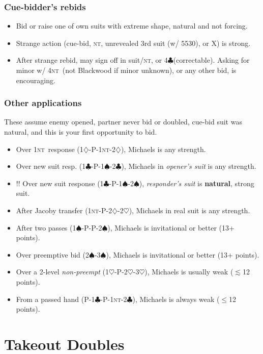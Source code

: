 \documentclass[10pt]{article}
\def\C{$\clubsuit$}
\def\D{$\diamondsuit$}
\def\H{$\heartsuit$}
\def\S{$\spadesuit$}
\def\NT{\textsc{nt}}
\let\TeXle\le
\def\le{$\TeXle$}
\def\ltsim{$\lesssim$}
\newenvironment{mylist}[1][.5]{\begin{itemize}\itemsep=-#1\baselineskip}{\end{itemize}}
\begin{document}
\subsubsection{Cue-bidder's rebids}
\begin{mylist}[.3]
\item Bid or raise one of own suits with extreme shape, natural and not forcing.
\item Strange action (cue-bid, \NT, unrevealed 3rd suit (w/ 5530), or X) is strong.
\item {\small After strange rebid, may sign off in suit/\NT, or 4\C (correctable).  Asking for minor w/ 4\NT\ (not Blackwood if minor unknown), or any other bid, is encouraging.}
\end{mylist}

\subsubsection{Other applications}
These assume enemy opened, partner never bid or doubled, cue-bid suit was 
natural, and this is your first opportunity to bid.
\begin{mylist}[.3]
\small
\item Over 1\NT\ response (1\D-P-1\NT-2\D), Michaels is any strength.
\item Over new suit resp. (1\C-P-1\S-2\C), Michaels in \emph{opener's suit} is any strength.
\item[!!] Over new suit response (1\C-P-1\S-2\S), \emph{responder's suit} is \textbf{natural}, strong suit.
\item After Jacoby transfer (1\NT-P-2\D-2\H), Michaels in real suit is any strength.
\item After two passes (1\S-P-P-2\S), Michaels is invitational or better (13+ points).
\item Over preemptive bid (2\S-3\S), Michaels is invitational or better (13+ points).
\item Over a 2-level \emph{non-preempt} (1\H-P-2\H-3\H), Michaels is usually weak (\ltsim12 points).
\item From a passed hand (P-1\C-P-1\NT-2\C), Michaels is always weak (\le 12 points).
\end{mylist}




\section{Takeout Doubles}
\end{document}
